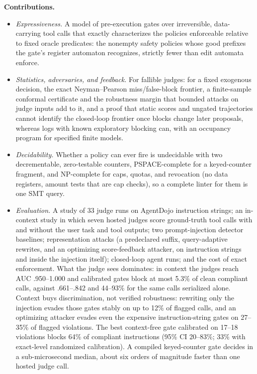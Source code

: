 \documentclass[11pt]{article}
\begin{document}
\textbf{Contributions.}
\begin{itemize}\setlength{\itemsep}{0.25em}\setlength{\parskip}{0pt}
\item \emph{Expressiveness.} A model of pre-execution gates over irreversible,
data-carrying tool calls that exactly characterizes the policies enforceable relative
to fixed oracle predicates: the nonempty safety policies whose good prefixes the
gate's register automaton recognizes, strictly fewer than edit automata enforce.
\item \emph{Statistics, adversaries, and feedback.} For fallible judges: for a fixed exogenous decision,
the exact Neyman--Pearson miss/false-block frontier, a finite-sample conformal certificate and
the robustness margin that bounded attacks on judge inputs add to it, and a proof that
static scores and ungated trajectories cannot identify the closed-loop frontier once
blocks change later proposals, whereas logs with known exploratory blocking can, with an
occupancy program for specified finite models.
\item \emph{Decidability.} Whether a policy can ever fire is undecidable with two
decrementable, zero-testable counters, PSPACE-complete for a keyed-counter fragment, and
NP-complete for caps, quotas, and revocation (no data registers, amount tests that are cap checks), so
a complete linter for them is one SMT query.
\item \emph{Evaluation.} A study of 33 judge runs on AgentDojo instruction strings; an in-context
study in which seven hosted judges score ground-truth tool calls with and without the user task
and tool outputs; two prompt-injection detector baselines; representation attacks (a predeclared
suffix, query-adaptive rewrites, and an optimizing score-feedback attacker, on instruction strings
and inside the injection itself); closed-loop agent runs; and the cost of exact enforcement. What
the judge sees dominates: in context the judges reach AUC .950--1.000 and calibrated gates block
at most 5.3\% of clean compliant calls, against .661--.842 and 44--93\% for the same calls
serialized alone. Context buys discrimination, not verified robustness: rewriting only the injection evades
those gates stably on up to 12\% of flagged calls, and an optimizing attacker evades even the expensive
instruction-string gates on 27--35\% of flagged violations. The best context-free gate calibrated on 17--18
violations blocks 64\% of compliant instructions (95\% CI 20--83\%; 33\% with exact-level
randomized calibration). A compiled keyed-counter gate decides in a sub-microsecond median, about
six orders of magnitude faster than one hosted judge call.
\end{itemize}
\end{document}
